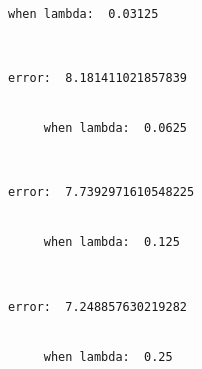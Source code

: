 \documentclass[11pt]{article}
\begin{document}
    \begin{Verbatim}[commandchars=\\\{\}]
     when lambda:  0.03125

    \end{Verbatim}

    \begin{center}
    \end{center}
    { \hspace*{\fill} \\}
    
    \begin{Verbatim}[commandchars=\\\{\}]
     error:  8.181411021857839


     when lambda:  0.0625

    \end{Verbatim}

    \begin{center}
    \end{center}
    { \hspace*{\fill} \\}
    
    \begin{Verbatim}[commandchars=\\\{\}]
     error:  7.7392971610548225


     when lambda:  0.125

    \end{Verbatim}

    \begin{center}
    \end{center}
    { \hspace*{\fill} \\}
    
    \begin{Verbatim}[commandchars=\\\{\}]
     error:  7.248857630219282


     when lambda:  0.25

    \end{Verbatim}

    \begin{center}
    \end{center}
    { \hspace*{\fill} \\}
    
\end{document}
